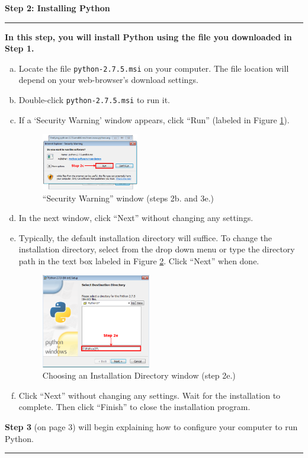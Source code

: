 \documentclass[11pt,english]{article}
\newcommand{\myhrule}{\vspace{0.3cm}\hrule\vspace{0.3cm}}
\begin{document}
\newpage
{\Large {\bf Step 2: Installing Python}}
\myhrule
{\bf In this step, you will install Python using the file you downloaded in
Step 1.}
\begin{enumerate}[a.]
\item Locate the file \texttt{python-2.7.5.msi} on your computer. The file
location will depend on your web-browser's download settings.
\item Double-click \texttt{python-2.7.5.msi} to run it.
\item If a `Security Warning' window appears, click ``Run'' (labeled in Figure
\ref{fig:dia2}).
\begin{figure}[h]
\begin{center}
\includegraphics[width=0.4\textwidth]{dia2}
\end{center}
\vspace{-0.5cm}
\caption{``Security Warning'' window (steps 2b. and 3e.)}
\label{fig:dia2}
\end{figure}
\item In the next window, click ``Next'' without changing any settings.
\item Typically, the default installation directory will suffice. To change the
installation directory, select from the drop down menu or type the directory
path in the text box labeled in Figure \ref{fig:dia3}. Click ``Next'' when
done.
\begin{figure}[h]
\begin{center}
\includegraphics[width=0.45\textwidth]{dia3}
\end{center}
\vspace{-0.5cm}
\caption{Choosing an Installation Directory window (step 2e.)}
\label{fig:dia3}
\end{figure}
\item Click ``Next'' without changing any settings. Wait for the installation
to complete. Then click ``Finish'' to close the installation program.
\end{enumerate}
\vfill
{\bf Step 3} (on page 3) will begin explaining how to configure your computer
to run Python.
\myhrule
\end{document}
